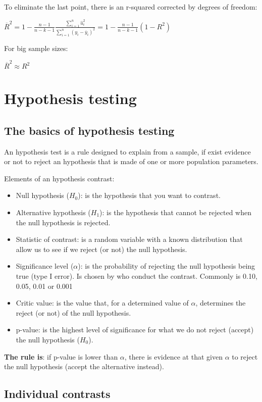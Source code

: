 \documentclass[10pt,landscape]{article}
\begin{document}
\begin{multicols}{3}
To eliminate the last point, there is an r-squared corrected by degrees of freedom:

$\overline{R}^2 = 1 - \frac{n-1}{n-k-1} \frac{\sum_{i=1}^n \hat{u}_i^2}{\sum_{i=1}^n (y_i - \overline{y}_i)^2} = 1 - \frac{n-1}{n-k-1} (1-R^2)$

For big sample sizes:

$\overline{R}^2 \approx R^2$

\section*{Hypothesis testing}

\subsection*{The basics of hypothesis testing}

An hypothesis test is a rule designed to explain from a sample, if exist evidence or not to reject an hypothesis that is made of one or more population parameters.

Elements of an hypothesis contrast:

\begin{itemize}[leftmargin=*]
\item Null hypothesis ($H_0$): is the hypothesis that you want to contrast.
\item Alternative hypothesis ($H_1$): is the hypothesis that cannot be rejected when the null hypothesis is rejected.
\item Statistic of contrast: is a random variable with a known distribution that allow us to see if we reject (or not) the null hypothesis.
\item Significance level ($\alpha$): is the probability of rejecting the null hypothesis being true (type I error). Is chosen by who conduct the contrast. Commonly is 0.10, 0.05, 0.01 or 0.001
\item Critic value: is the value that, for a determined value of $\alpha$, determines the reject (or not) of the null hypothesis.
\item p-value: is the highest level of significance for what we do not reject (accept) the null hypothesis ($H_0$).
\end{itemize}

\textbf{The rule is}: if p-value is lower than $\alpha$, there is evidence at that given $\alpha$ to reject the null hypothesis (accept the alternative instead).

\subsection*{Individual contrasts}


\end{multicols}
\end{document}
